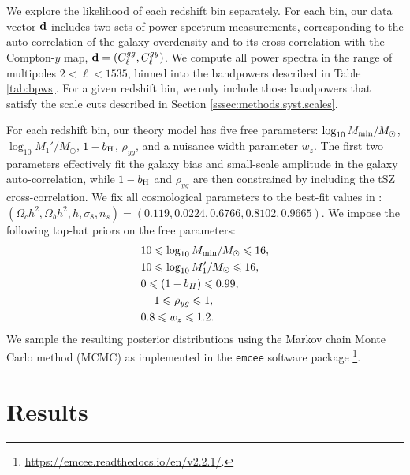 \documentclass[useAMS,usenatbib]{mn2e}
\begin{document}
    We explore the likelihood of each redshift bin separately. For each bin, our data vector ${\bf d}$ includes two sets of power spectrum measurements, corresponding to the auto-correlation of the galaxy overdensity and to its cross-correlation with the Compton-$y$ map, ${\bf d}=(C^{gg}_\ell,C^{gy}_\ell)$. We compute all power spectra in the range of multipoles $2<\ell<1535$, binned into the bandpowers described in Table \ref{tab:bpws}. For a given redshift bin, we only include those bandpowers that satisfy the scale cuts described in Section \ref{sssec:methods.syst.scales}.

    For each redshift bin, our theory model has five free parameters: $\log_{10}M_{\rm min}/M_\odot$, $\log_{10}M_1'/M_\odot$, $1-b_{\rm H}$, $\rho_{yg}$, and a nuisance width parameter $w_z$. The first two parameters effectively fit the galaxy bias and small-scale amplitude in the galaxy auto-correlation, while $1-b_{\rm H}$ and $\rho_{yg}$ are then constrained by including the tSZ cross-correlation. We fix all cosmological parameters to the best-fit values in \cite{2018arXiv180706209P}: $(\Omega_c h^2,\Omega_bh^2,h,\sigma_8,n_s)=(0.119,0.0224,0.6766,0.8102,0.9665)$. We impose the following top-hat priors on the free parameters:
    \begin{align}
      &10\le\log_{10}M_{\rm min}/M_\odot\le16,\\
      &10\le\log_{10}M_1'/M_\odot\le16,\\
      &0\le(1-b_H)\le0.99,\\
      &-1\le\rho_{yg}\le1,\\
      &0.8\le w_z\le1.2.
    \end{align}
    We sample the resulting posterior distributions using the Markov chain Monte Carlo method (MCMC) as implemented in the {\tt emcee} software package \citep{2013PASP..125..306F}\footnote{\url{https://emcee.readthedocs.io/en/v2.2.1/}.}.

\section{Results}\label{sec:results}
\end{document}
